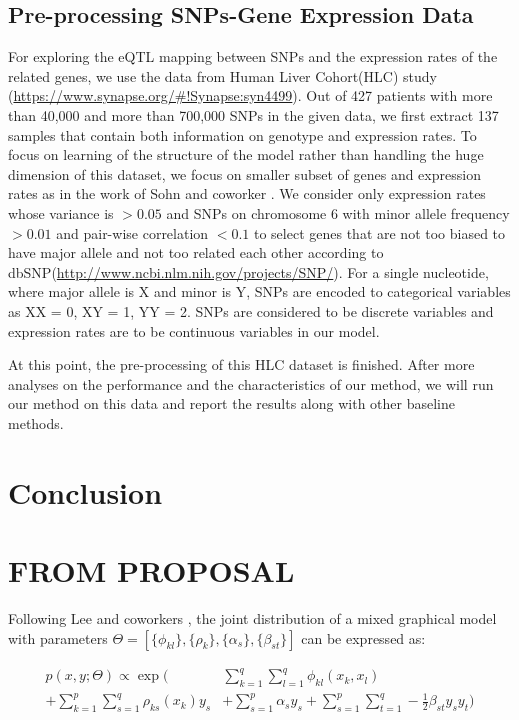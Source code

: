 \documentclass{article}
\begin{document}
\subsection{Pre-processing SNPs-Gene Expression Data}
For exploring the eQTL mapping between SNPs and the expression rates of the related genes, we use the data from Human Liver Cohort(HLC) study \cite{schadt2008mapping} (\url{https://www.synapse.org/#!Synapse:syn4499}). Out of 427 patients with more than 40,000 and more than 700,000 SNPs in the given data, we first extract 137 samples that contain both information on genotype and expression rates. To  focus on learning of the structure of the model rather than handling the huge dimension of this dataset, we focus on smaller subset of genes and expression rates as in the work of Sohn and coworker \cite{sohn2012joint}. We consider only expression rates whose variance is $ > 0.05$ and SNPs on chromosome 6 with minor allele frequency $ > 0.01$ and pair-wise correlation $ < 0.1$ to select genes that are not too biased to have major allele and not too related each other according to dbSNP(\url{http://www.ncbi.nlm.nih.gov/projects/SNP/}). For a single nucleotide, where major allele is X and minor is Y, SNPs are encoded to categorical variables as XX = 0, XY = 1, YY = 2. SNPs are considered to be discrete variables and expression rates are to be continuous variables in our model.
 
At this point, the pre-processing of this HLC dataset is finished. After more analyses on the performance and the characteristics of our method, we will run our method on this data and report the results along with other baseline methods.

\section{Conclusion}



\section{FROM PROPOSAL}

Following Lee and coworkers \cite{lee2013structure}, the joint distribution of a mixed graphical model with parameters $\Theta = [\{\phi_{kl}\}, \{\rho_{k}\}, \{\alpha_{s}\}, \{\beta_{st}\}]$ can be expressed as:

\begin{align}
p(x, y ; \Theta) \propto \exp \Big( &\sum_{k=1}^{q} \sum_{l=1}^{q} \phi_{kl} (x_k, x_l) \nonumber \\
+ \sum_{k=1}^{p} \sum_{s=1}^{q} \rho_{ks}(x_k) y_s  &+ \sum_{s=1}^{p} \alpha_s y_s + \sum_{s=1}^{p} \sum_{t=1}^{q} -\frac{1}{2} \beta_{st} y_s y_t \Big)
\end{align} 
\end{document}
